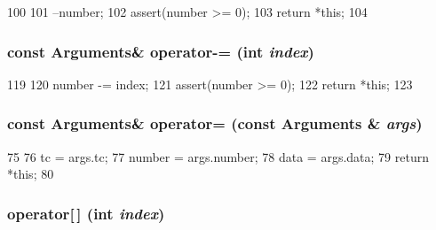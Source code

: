 \begin{DoxyCode}
100                             {
101         --number;
102         assert(number >= 0);
103         return *this;
104     }
\end{DoxyCode}
\hypertarget{classArguments_a55202bb4daa309e3bdf0d4f488f0b61b}{
\subsubsection[{operator-\/=}]{\setlength{\rightskip}{0pt plus 5cm}const {\bf Arguments}\& operator-\/= (int {\em index})}}
\label{classArguments_a55202bb4daa309e3bdf0d4f488f0b61b}



\begin{DoxyCode}
119                                            {
120         number -= index;
121         assert(number >= 0);
122         return *this;
123     }
\end{DoxyCode}
\hypertarget{classArguments_ae286709bbff703528eab0c4d4ce745c1}{
\subsubsection[{operator=}]{\setlength{\rightskip}{0pt plus 5cm}const {\bf Arguments}\& operator= (const {\bf Arguments} \& {\em args})}}
\label{classArguments_ae286709bbff703528eab0c4d4ce745c1}



\begin{DoxyCode}
75                                                       {
76         tc = args.tc;
77         number = args.number;
78         data = args.data;
79         return *this;
80     }
\end{DoxyCode}
\hypertarget{classArguments_a008beadd17c801428c1c7cd90ce1ce49}{
\subsubsection[{operator[]}]{ operator\mbox{[}$\,$\mbox{]} (int {\em index})}}
\label{classArguments_a008beadd17c801428c1c7cd90ce1ce49}




